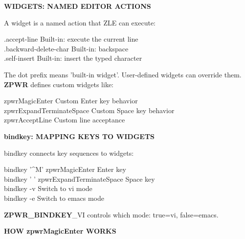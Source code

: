 \documentclass[11pt,a4paper,twoside]{book}
\begin{document}
\vspace{12pt}
{\bfseries\color{neonyellow} WIDGETS: NAMED \textbf{EDITOR} ACTIONS}\vspace{4pt}

A widget is a named action that ZLE can execute:

\begin{codebox}
\color{neongreen}.accept-line          Built-in: execute the current line\\
\color{neongreen}.backward-delete-char  Built-in: backspace\\
\color{neongreen}.self-insert           Built-in: insert the typed character\\
\end{codebox}

The dot prefix means 'built-in widget'. User-defined widgets can override them. \textbf{ZPWR} defines custom widgets like:

\begin{codebox}
\color{neongreen}zpwrMagicEnter         Custom Enter key behavior\\
\color{neongreen}zpwrExpandTerminateSpace Custom Space key behavior\\
\color{neongreen}zpwrAcceptLine          Custom line acceptance\\
\end{codebox}


\vspace{12pt}
{\bfseries\color{neonyellow} bindkey: MAPPING KEYS TO WIDGETS}\vspace{4pt}

bindkey connects key sequences to widgets:

\begin{codebox}
\color{neongreen}bindkey '\textasciicircum{}M' zpwrMagicEnter    Enter key\\
\color{neongreen}bindkey ' ' zpwrExpandTerminateSpace  Space key\\
\color{neongreen}bindkey -v                     Switch to vi mode\\
\color{neongreen}bindkey -e                     Switch to emacs mode\\
\end{codebox}

\textbf{ZPWR\_BINDKEY}\_VI controls which mode: true=vi, false=emacs.


\vspace{12pt}
{\bfseries\color{neonyellow} HOW zpwrMagicEnter WORKS}\vspace{4pt}
\end{document}

